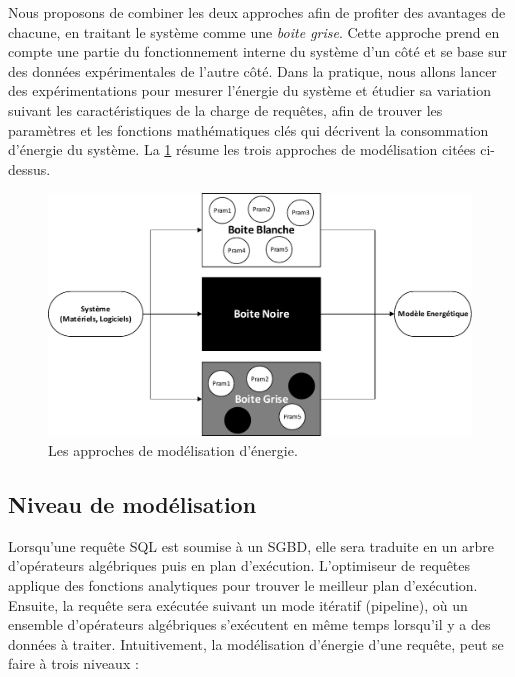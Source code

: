 Nous proposons de combiner les deux approches afin de profiter des avantages de chacune, en traitant le système comme une \textit{boite grise}. Cette approche prend en compte une partie du fonctionnement interne du système d'un côté et se base sur des données expérimentales de l'autre côté. Dans la pratique, nous allons lancer des expérimentations pour mesurer l'énergie du système et étudier sa variation suivant les caractéristiques de la charge de requêtes, afin de trouver les paramètres et les fonctions mathématiques clés qui décrivent la consommation d'énergie du système. La \ref{fig:modelling-approaches} résume les trois approches de modélisation citées ci-dessus.

\begin{figure}
 \centering
 \includegraphics[scale=0.60]{chapitre4/chap4Fig/modelling-approaches.pdf}
 \caption{Les approches de modélisation d'énergie.}
 \label{fig:modelling-approaches}
\end{figure}

\subsection{Niveau de modélisation}
Lorsqu'une requête SQL est soumise à un SGBD, elle sera traduite en un arbre d'opérateurs algébriques puis en plan d'exécution. L'optimiseur de requêtes applique des fonctions analytiques pour trouver le meilleur plan d'exécution. Ensuite, la requête sera exécutée suivant un mode itératif (pipeline), où un ensemble d'opérateurs algébriques s'exécutent en même temps lorsqu'il y a des données à traiter.
Intuitivement, la modélisation d'énergie d'une requête,  peut se faire à trois niveaux :


